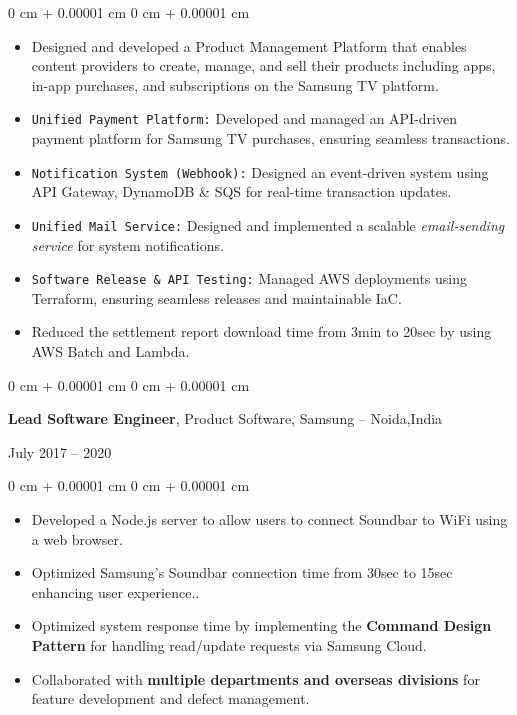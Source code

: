 \documentclass[10pt, a4paper]{article}
\newenvironment{highlights}{
    \begin{itemize}[
        topsep=0.10 cm,
        parsep=0.10 cm,
        partopsep=0pt,
        itemsep=0pt,
        leftmargin=0 cm + 10pt
    ]
}{
    \end{itemize}
} %
\newenvironment{onecolentry}{
    \begin{adjustwidth}{
        0 cm + 0.00001 cm
    }{
        0 cm + 0.00001 cm
    }
}{
    \end{adjustwidth}
} %
\newenvironment{twocolentry}[2][]{
    \onecolentry
    \def\secondColumn{#2}
    \setcolumnwidth{\fill, 4.5 cm}
    \begin{paracol}{2}
}{
    \switchcolumn \raggedleft \secondColumn
    \end{paracol}
    \endonecolentry
} %
\begin{document}
\begin{onecolentry}
    \begin{highlights}
    \item Designed and developed a Product Management Platform that enables content providers to create, manage, and sell their products including apps, in-app purchases, and subscriptions on the Samsung TV platform.
        \item \texttt{Unified Payment Platform:} Developed and managed an API-driven payment platform for Samsung TV purchases, ensuring seamless transactions.
        \item \texttt{Notification System (Webhook):} Designed an event-driven system using {API Gateway, DynamoDB \& SQS} for real-time transaction updates.
        \item \texttt{Unified Mail Service:} Designed and implemented a scalable \textit{email-sending service} for system notifications.
        \item \texttt{Software Release \& API Testing:}   Managed AWS deployments using Terraform, ensuring seamless releases and maintainable IaC.
        \item Reduced the settlement report download time from 3min to 20sec by using AWS Batch and Lambda.
    \end{highlights}
\end{onecolentry}


        \vspace{0.2 cm}

        \begin{twocolentry}{
            July 2017 – 2020
        }
            \textbf{Lead Software Engineer}, Product Software, Samsung -- Noida,India
        \end{twocolentry}

        \vspace{0.10 cm}
       \begin{onecolentry} 
    \begin{highlights}
        \item Developed a Node.js server to allow users to connect Soundbar to WiFi using a web browser.
        \item Optimized Samsung's Soundbar connection time from 30sec to 15sec enhancing user experience..
        \item Optimized system response time by implementing the \textbf{Command Design Pattern} for handling read/update requests via Samsung Cloud.
        \item Collaborated with \textbf{multiple departments and overseas divisions} for feature development and defect management.
    \end{highlights}
\end{onecolentry}
\end{document}
